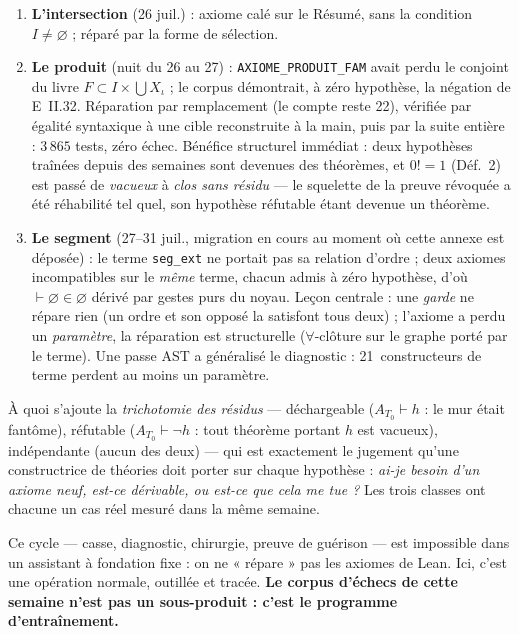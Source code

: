 \begin{enumerate}
\item \textbf{L'intersection} (26 juil.) : axiome calé sur le Résumé, sans la
  condition $I\neq\varnothing$ ; réparé par la forme de sélection.
\item \textbf{Le produit} (nuit du 26 au 27) : \texttt{AXIOME\_PRODUIT\_FAM}
  avait perdu le conjoint du livre $F\subset I\times\bigcup X_\iota$ ; le corpus
  démontrait, à zéro hypothèse, la négation de E~II.32. Réparation par
  remplacement (le compte reste 22), vérifiée par égalité syntaxique à une cible
  reconstruite à la main, puis par la suite entière : $3\,865$ tests, zéro
  échec. Bénéfice structurel immédiat : deux hypothèses traînées depuis des
  semaines sont devenues des théorèmes, et $0!=1$ (Déf.~2) est passé de
  \emph{vacueux} à \emph{clos sans résidu} --- le squelette de la preuve
  révoquée a été réhabilité tel quel, son hypothèse réfutable étant devenue un
  théorème.
\item \textbf{Le segment} (27--31 juil., migration en cours au moment où cette
  annexe est déposée) : le terme \texttt{seg\_ext} ne portait pas sa relation
  d'ordre ; deux axiomes incompatibles sur le \emph{même} terme, chacun admis à
  zéro hypothèse, d'où $\vdash \varnothing\in\varnothing$ dérivé par gestes purs
  du noyau. Leçon centrale : une \emph{garde} ne répare rien (un ordre et son
  opposé la satisfont tous deux) ; l'axiome a perdu un \emph{paramètre}, la
  réparation est structurelle ($\forall$-clôture sur le graphe porté par le
  terme). Une passe AST a généralisé le diagnostic : 21~constructeurs de terme
  perdent au moins un paramètre.
\end{enumerate}

À quoi s'ajoute la \emph{trichotomie des résidus} --- déchargeable ($A_{T_0}
\vdash h$ : le mur était fantôme), réfutable ($A_{T_0}\vdash\lnot h$ : tout
théorème portant $h$ est vacueux), indépendante (aucun des deux) --- qui est
exactement le jugement qu'une constructrice de théories doit porter sur chaque
hypothèse : \emph{ai-je besoin d'un axiome neuf, est-ce dérivable, ou est-ce que
cela me tue ?} Les trois classes ont chacune un cas réel mesuré dans la même
semaine.

Ce cycle --- casse, diagnostic, chirurgie, preuve de guérison --- est
impossible dans un assistant à fondation fixe : on ne « répare » pas les axiomes
de Lean. Ici, c'est une opération normale, outillée et tracée. \textbf{Le corpus
d'échecs de cette semaine n'est pas un sous-produit : c'est le programme
d'entraînement.}

